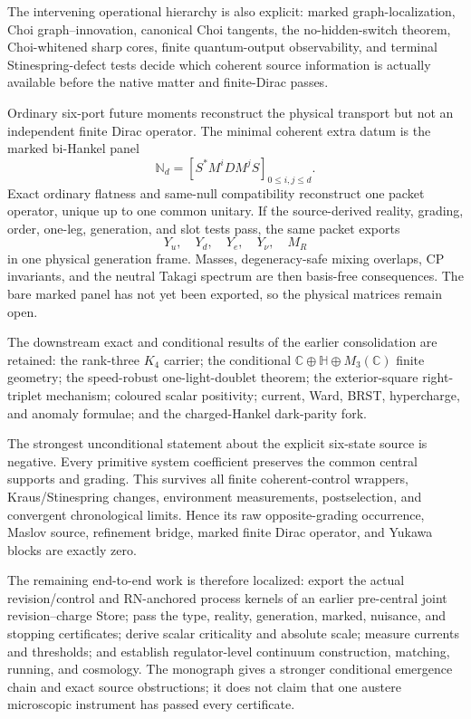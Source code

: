 \documentclass[11pt,oneside,openany]{book}
\numberwithin{equation}{chapter}
\theoremstyle{definition}
\theoremstyle{remark}
\newcommand{\C}{\mathbb C}
\newcommand{\HH}{\mathbb H}
\begin{document}
The intervening operational hierarchy is also explicit: marked graph-localization, Choi graph--innovation, canonical Choi tangents, the no-hidden-switch theorem, Choi-whitened sharp cores, finite quantum-output observability, and terminal Stinespring-defect tests decide which coherent source information is actually available before the native matter and finite-Dirac passes.

Ordinary six-port future moments reconstruct the physical transport but not an
independent finite Dirac operator.  The minimal coherent extra datum is the
marked bi-Hankel panel
\[
 \mathbb N_d=[S^*M^iDM^jS]_{0\le i,j\le d}.
\]
Exact ordinary flatness and same-null compatibility reconstruct one packet
operator, unique up to one common unitary.  If the source-derived reality,
grading, order, one-leg, generation, and slot tests pass, the same packet
exports
\[
 Y_u,\quad Y_d,\quad Y_e,\quad Y_\nu,\quad M_R
\]
in one physical generation frame.  Masses, degeneracy-safe mixing overlaps,
CP invariants, and the neutral Takagi spectrum are then basis-free
consequences.  The bare marked panel has not yet been exported, so the physical
matrices remain open.

The downstream exact and conditional results of the earlier consolidation are
retained: the rank-three \(K_4\) carrier; the conditional
\(\C\oplus\HH\oplus M_3(\C)\) finite geometry; the speed-robust one-light-doublet
theorem; the exterior-square right-triplet mechanism; coloured scalar
positivity; current, Ward, BRST, hypercharge, and anomaly formulae; and the
charged-Hankel dark-parity fork.

The strongest unconditional statement about the explicit six-state source is
negative.  Every primitive system coefficient preserves the common central
supports and grading.  This survives all finite coherent-control wrappers,
Kraus/Stinespring changes, environment measurements, postselection, and
convergent chronological limits.  Hence its raw opposite-grading occurrence,
Maslov source, refinement bridge, marked finite Dirac operator, and Yukawa
blocks are exactly zero.

The remaining end-to-end work is therefore localized: export the actual
revision/control and RN-anchored process kernels of an earlier pre-central
joint revision--charge Store; pass the type, reality, generation, marked,
nuisance, and stopping certificates; derive scalar criticality and absolute
scale; measure currents and thresholds; and establish regulator-level
continuum construction, matching, running, and cosmology.  The monograph gives
a stronger conditional emergence chain and exact source obstructions; it does
not claim that one austere microscopic instrument has passed every certificate.
\end{document}
